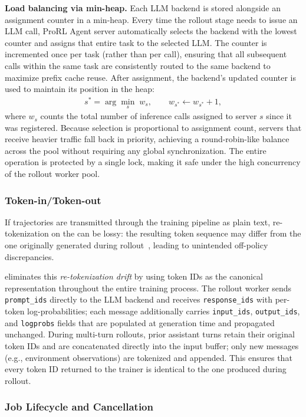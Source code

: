 \textbf{Load balancing via min-heap.}
Each LLM backend is stored alongside an assignment counter in a min-heap.
Every time the rollout stage needs to issue an LLM call, ProRL Agent server automatically selects the backend with the lowest counter and assigns that entire task to the selected LLM. The counter is incremented once per task (rather than per call), ensuring that all subsequent calls within the same task are consistently routed to the same backend to maximize prefix cache reuse. After assignment, the backend’s updated counter is used to maintain its position in the heap:
\begin{align*}
  s^{*} = \arg\min_{s}\; w_{s}, \qquad w_{s^{*}} \leftarrow w_{s^{*}} + 1,
\end{align*}
where $w_s$ counts the total number of inference calls assigned to server $s$ since it was registered.
Because selection is proportional to assignment count, servers that receive heavier traffic fall back in priority, achieving a round-robin-like balance across the pool without requiring any global synchronization.
The entire operation is protected by a single lock, making it safe under the high concurrency of the rollout worker pool.


\subsubsection{Token-in/Token-out}
If trajectories are transmitted through the training pipeline as plain text, re-tokenization on the can be lossy: the resulting token sequence may differ from the one originally generated during rollout~\citep{team2025notokenization}, leading to unintended off-policy discrepancies.

\prorlagent eliminates this \emph{re-tokenization drift} by using token IDs as the canonical representation throughout the entire training process.
The rollout worker sends \texttt{prompt\_ids} directly to the LLM backend and receives \texttt{response\_ids} with per-token log-probabilities; each message additionally carries \texttt{input\_ids}, \texttt{output\_ids}, and \texttt{logprobs} fields that are populated at generation time and propagated unchanged.
During multi-turn rollouts, prior assistant turns retain their original token IDs and are concatenated directly into the input buffer; only new messages (e.g., environment observations) are tokenized and appended.
This ensures that every token ID returned to the trainer is identical to the one produced during rollout.

\subsubsection{Job Lifecycle and Cancellation}
\label{sec:lifecycle}


